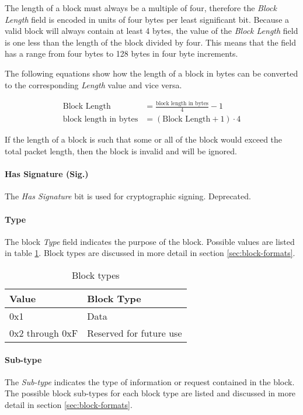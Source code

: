 The length of a block must always be a multiple of four, therefore the \emph{Block Length} field is encoded in units of
four bytes per least significant bit. Because a valid block will always contain at least 4 bytes, the value of the
\emph{Block Length} field is one less than the length of the block divided by four. This means that the field has a
range from four bytes to 128 bytes in four byte increments.

The following equations show how the length of a block in bytes can be converted to the corresponding \emph{Length}
value and vice versa.

\begin{align*}
    \text{Block Length}          & = \frac{\text{block length in bytes}}{4} - 1   \\
    \text{block length in bytes} & = \left(\text{Block Length} + 1\right) \cdot 4
\end{align*}

If the length of a block is such that some or all of the block would exceed the total packet length, then the block is
invalid and will be ignored.

\paragraph{Has Signature (Sig.)}
The \emph{Has Signature} bit is used for cryptographic signing. Deprecated.

\paragraph{Type}
The block \emph{Type} field indicates the purpose of the block. Possible values are listed in table
\ref{table:block-types}. Block types are discussed in more detail in section \ref{sec:block-formats}.

\begin{table}[H]
    \centering
    \begin{tabular}{@{}ll@{}}
        \toprule
        Value           & Block Type              \\
        \midrule
        0x1             & Data                    \\
        0x2 through 0xF & Reserved for future use \\
        \bottomrule
    \end{tabular}
    \caption{Block types}
    \label{table:block-types}
\end{table}

\paragraph{Sub-type}
The \emph{Sub-type} indicates the type of information or request contained in the block. The possible block sub-types
for each block type are listed and discussed in more detail in section \ref{sec:block-formats}.

